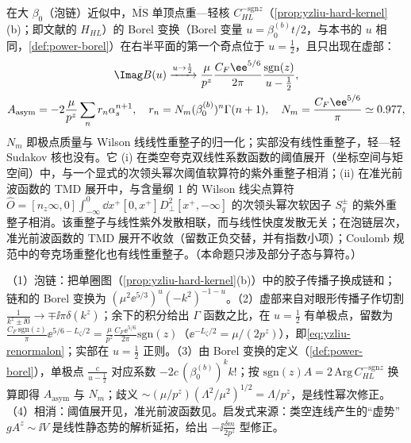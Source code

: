 \begin{proposition}\label{prop:yzliu-linear-renormalon}
在大 $\beta_0$（泡链）近似中，$\overline{\mathrm{MS}}$ 单顶点重—轻核 $C^{-\mathrm{sgn}z}_{HL}$（\cref{prop:yzliu-hard-kernel}(b)；即文献\cite{Liu:2023onm}的 $H_{HL}$）的 Borel 变换（Borel 变量 $u=\beta_0^{(b)}t/2$，与本书的 $u$ 相同，\cref{def:power-borel}）在右半平面的第一个奇点位于 $u=\frac12$，且只出现在虚部： %
\begin{equation}\label{eq:yzliu-renormalon}
\begin{gathered}
\Imag B(u)\xrightarrow{u\to\frac12}\frac{\mu}{p^z}\frac{C_F\ee^{5/6}}{2\pi}\frac{\mathrm{sgn}(z)}{u-\frac12},\\
A_{\mathrm{asym}}=-2\frac{\mu}{p^z}\sum_nr_n\alpha_s^{n+1},\quad r_n=N_m(\beta_0^{(b)})^n\Gamma(n+1),\quad N_m=\frac{C_F\ee^{5/6}}{\pi}\simeq0.977,
\end{gathered}
\end{equation}
$N_m$ 即极点质量与 Wilson 线线性重整子的归一化；实部没有线性重整子，轻—轻 Sudakov 核也没有。它 (i) 在类空夸克双线性系数函数的阈值展开（坐标空间与矩空间）中，与一个显式的次领头幂次阈值软算符的紫外重整子相消；(ii) 在准光前波函数的 TMD 展开中，与含量纲 1 的 Wilson 线尖点算符 $\hat O=[n_z\infty,0]\int_{-\infty}^0\dd x^+[0,x^+]D_\perp^2[x^+,-\infty]$ 的次领头幂次软因子 $S^\pm_q$ 的紫外重整子相消。该重整子与线性紫外发散相联，而与线性快度发散无关；在泡链层次，准光前波函数的 TMD 展开不收敛（留数正负交替，并有指数小项）；Coulomb 规范中的夸克场重整化也有线性重整子。（本命题只涉及部分子态与算符。）
\end{proposition}

\begin{proofsketch}
（1）泡链：把单圈图（\cref{prop:yzliu-hard-kernel}(b)）中的胶子传播子换成链和；链和的 Borel 变换为 $(\mu^2\ee^{5/3})^u(-k^2)^{-1-u}$\cite[式~(2.44)--(2.45)]{Liu:2023onm}。（2）虚部来自对眼形传播子作切割 $\frac1{k^z\pm\ii0}\to\mp\ii\pi\delta(k^z)$；余下的积分给出 $\Gamma$ 函数之比，在 $u=\frac12$ 有单极点，留数为 $\frac{C_F\,\mathrm{sgn}(z)}{\pi}\ee^{5/6-L_\zeta/2}=\frac{\mu}{p^z}\frac{C_F\ee^{5/6}}{2\pi}\mathrm{sgn}(z)$（$\ee^{-L_\zeta/2}=\mu/(2p^z)$），即\cref{eq:yzliu-renormalon}\cite[式~(2.46)--(2.47)]{Liu:2023onm}；实部在 $u=\frac12$ 正则。（3）由 Borel 变换的定义（\cref{def:power-borel}），单极点 $\frac{c}{u-\frac12}$ 对应系数 $-2c\,(\beta_0^{(b)})^kk!$；按 $\mathrm{sgn}(z)A=2\,\mathrm{Arg}\,C^{-\mathrm{sgn}z}_{HL}$ 换算即得 $A_{\mathrm{asym}}$ 与 $N_m$\cite[式~(2.48)--(2.50)]{Liu:2023onm}；歧义 $\sim(\mu/p^z)(\Lambda^2/\mu^2)^{1/2}=\Lambda/p^z$，是线性幂次修正。（4）相消：阈值展开见\cite[第~3.6~节]{Liu:2023onm}，准光前波函数见\cite[第~4.3--4.4~节、式~(4.28)--(4.33)]{Liu:2023onm}。启发式来源：类空连线产生的“虚势” $gA^z\sim\ii V$ 是线性静态势的解析延拓，给出 $-\ii\frac{\delta m}{2p^z}$ 型修正。
\end{proofsketch}

